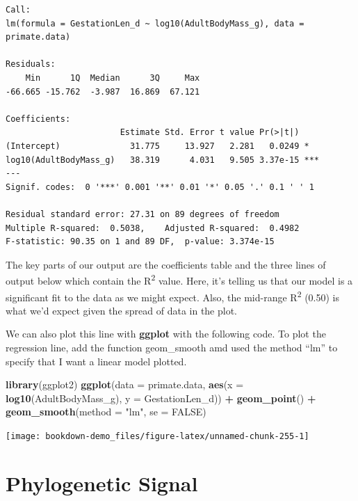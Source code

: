 \documentclass[
]{book}
\newenvironment{Shaded}{\begin{snugshade}}{\end{snugshade}}
\newcommand{\DataTypeTok}[1]{\textcolor[rgb]{0.13,0.29,0.53}{#1}}
\newcommand{\KeywordTok}[1]{\textcolor[rgb]{0.13,0.29,0.53}{\textbf{#1}}}
\newcommand{\NormalTok}[1]{#1}
\newcommand{\OperatorTok}[1]{\textcolor[rgb]{0.81,0.36,0.00}{\textbf{#1}}}
\newcommand{\OtherTok}[1]{\textcolor[rgb]{0.56,0.35,0.01}{#1}}
\newcommand{\StringTok}[1]{\textcolor[rgb]{0.31,0.60,0.02}{#1}}
\begin{document}
\begin{verbatim}
Call:
lm(formula = GestationLen_d ~ log10(AdultBodyMass_g), data = primate.data)

Residuals:
    Min      1Q  Median      3Q     Max 
-66.665 -15.762  -3.987  16.869  67.121 

Coefficients:
                       Estimate Std. Error t value Pr(>|t|)    
(Intercept)              31.775     13.927   2.281   0.0249 *  
log10(AdultBodyMass_g)   38.319      4.031   9.505 3.37e-15 ***
---
Signif. codes:  0 '***' 0.001 '**' 0.01 '*' 0.05 '.' 0.1 ' ' 1

Residual standard error: 27.31 on 89 degrees of freedom
Multiple R-squared:  0.5038,    Adjusted R-squared:  0.4982 
F-statistic: 90.35 on 1 and 89 DF,  p-value: 3.374e-15
\end{verbatim}

The key parts of our output are the coefficients table and the three lines of output below which contain the R\textsuperscript{2} value. Here, it's telling us that our model is a significant fit to the data as we might expect. Also, the mid-range R\textsuperscript{2} (0.50) is what we'd expect given the spread of data in the plot.

We can also plot this line with \textbf{ggplot} with the following code. To plot the regression line, add the function geom\_smooth amd used the method ``lm'' to specify that I want a linear model plotted.

\begin{Shaded}
\begin{Highlighting}[]
\KeywordTok{library}\NormalTok{(ggplot2)}
\KeywordTok{ggplot}\NormalTok{(}\DataTypeTok{data =}\NormalTok{ primate.data, }\KeywordTok{aes}\NormalTok{(}\DataTypeTok{x =} \KeywordTok{log10}\NormalTok{(AdultBodyMass\_g), }\DataTypeTok{y =}\NormalTok{ GestationLen\_d)) }\OperatorTok{+}
\StringTok{  }\KeywordTok{geom\_point}\NormalTok{() }\OperatorTok{+}\StringTok{ }
\StringTok{  }\KeywordTok{geom\_smooth}\NormalTok{(}\DataTypeTok{method =} \StringTok{"lm"}\NormalTok{, }\DataTypeTok{se =} \OtherTok{FALSE}\NormalTok{)}
\end{Highlighting}
\end{Shaded}

\begin{center}\texttt{[image: bookdown-demo\_files/figure-latex/unnamed-chunk-255-1]} \end{center}

\hypertarget{phylogenetic-signal}{%
\section{Phylogenetic Signal}\label{phylogenetic-signal}}
\end{document}
